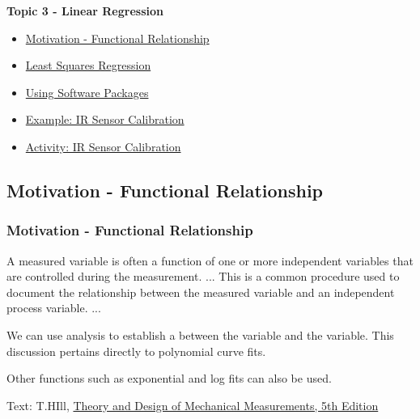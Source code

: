 \documentclass[fleqn]{ltx-talk} %
\newcommand{\sectionIIItitle}{Linear Regression}
\newcommand{\sectionIIIsubsectionItitle}{Motivation - Functional Relationship}
\newcommand{\sectionIIIsubsectionIItitle}{Least Squares Regression}
\newcommand{\sectionIIIsubsectionIIItitle}{Using Software Packages}
\newcommand{\sectionIIIsubsectionIVtitle}{Example: IR Sensor Calibration}
\newcommand{\sectionIIIsubsectionVtitle}{Activity: IR Sensor Calibration}
\newcommand{\ublank}{\underline{\hspace{20mm}}}
\begin{document}
		\begin{frame}
			\large \textbf{Topic 3 - \sectionIIItitle} \vspace{3mm}\\

			\begin{itemize}
				\item \hyperref[sectionIIIsubsectionI]{\sectionIIIsubsectionItitle} \vspc %
				\item \hyperref[sectionIIIsubsectionII]{\sectionIIIsubsectionIItitle} \vspc %
				\item \hyperref[sectionIIIsubsectionIII]{\sectionIIIsubsectionIIItitle} \vspc %
				\item \hyperref[sectionIIIsubsectionIV]{\sectionIIIsubsectionIVtitle} \vspc %
				\item \hyperref[sectionIIIsubsectionV]{\sectionIIIsubsectionVtitle} \vspc %
			\end{itemize}

		\end{frame}

		\subsection{\sectionIIIsubsectionItitle}\label{sectionIIIsubsectionI}

			\begin{frame}
				\frametitle{\sectionIIIsubsectionItitle}


A measured variable is often a function of one or more independent variables that are controlled during the measurement. ... This is a common procedure used to document the relationship between the measured variable and an independent process variable. ... \vspccc

We can use {\GR \ublank} analysis to establish a {\BL \ublank \ublank} between the {\PN \ublank} variable and the {\PR \ublank} variable. This discussion pertains directly to polynomial curve fits.\vspcc

Other functions such as exponential and log fits can also be used.

\vspace{10mm}
{\tiny Text: T.HIll, \underline{Theory and Design of Mechanical Measurements, 5th Edition} }

				
			\end{frame}
\end{document}
